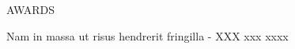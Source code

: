 \documentclass{article}
\newcommand{\sectionSpace}{\vspace{0.3in}}
\begin{document}
\sectionSpace{}

\begin{minipage}[t]{0.125\linewidth}
\uppercase{AWARDS}
\end{minipage}%
\hfill
\begin{minipage}[t]{0.85\linewidth}
Nam in massa ut risus hendrerit fringilla - XXX \hfill xxx xxxx
\end{minipage}
\end{document}

